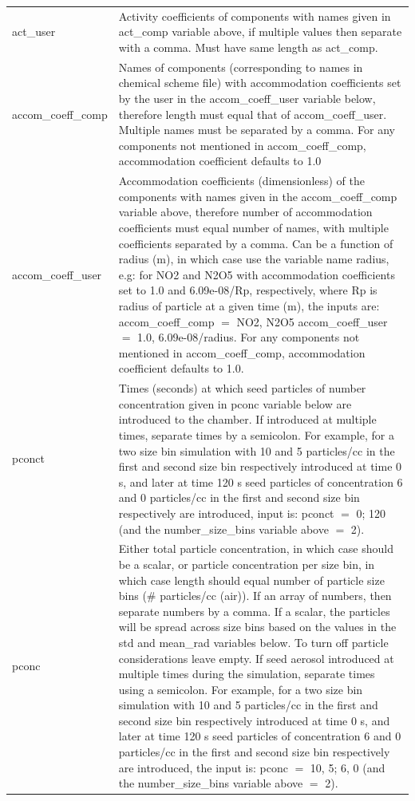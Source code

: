 \documentclass[gmd, manuscript]{copernicus}
\begin{document}
\begin{center}
\begin{supertabular}{p{0.15\textwidth}p{0.75\textwidth}}
act\_user & Activity coefficients of components with names given in act\_comp variable above, if multiple values then separate with a comma.  Must have same length as act\_comp.\\

accom\_coeff\_comp & Names of components (corresponding to names in chemical scheme file) with accommodation coefficients set by the user in the accom\_coeff\_user variable below, therefore length must equal that of accom\_coeff\_user.  Multiple names must be separated by a comma.  For any components not mentioned in accom\_coeff\_comp, accommodation coefficient defaults to 1.0\\

accom\_coeff\_user & Accommodation coefficients (dimensionless) of the components with names given in the accom\_coeff\_comp variable above, therefore number of accommodation coefficients must equal number of names, with multiple coefficients separated by a comma.  Can be a function of radius (m), in which case use the variable name radius, e.g: for NO2 and N2O5 with accommodation coefficients set to 1.0 and 6.09e-08/Rp, respectively, where Rp is radius of particle at a given time (m), the inputs are: accom\_coeff\_comp $=$ NO2, N2O5 accom\_coeff\_user $=$ 1.0, 6.09e-08/radius.  For any components not mentioned in accom\_coeff\_comp, accommodation coefficient defaults to 1.0.  \\

pconct & Times (seconds) at which seed particles of number concentration given in pconc variable below are introduced to the chamber.  If introduced at multiple times, separate times by a semicolon.  For example, for a two size bin simulation with 10 and 5 particles/cc in the first and second size bin respectively introduced at time 0 s, and later at time 120 s seed particles of concentration 6 and 0 particles/cc in the first and second size bin respectively are introduced, input is: pconct $=$ 0; 120 (and the number\_size\_bins variable above $=$ 2). \\

pconc & Either total particle concentration, in which case should be a scalar, or particle concentration per size bin, in which case length should equal number of particle size bins (\# particles/cc (air)).  If an array of numbers, then separate numbers by a comma.  If a scalar, the particles will be spread across size bins based on the values in the std and mean\_rad variables below.  To turn off particle considerations leave empty.  If seed aerosol introduced at multiple times during the simulation, separate times using a semicolon.  For example, for a two size bin simulation with 10 and 5 particles/cc in the first and second size bin respectively introduced at time 0 s, and later at time 120 s seed particles of concentration 6 and 0 particles/cc in the first and second size bin respectively are introduced, the input is: pconc $=$ 10, 5; 6, 0 (and the number\_size\_bins variable above $=$ 2).\\


\end{supertabular}
\end{center}
\end{document}
